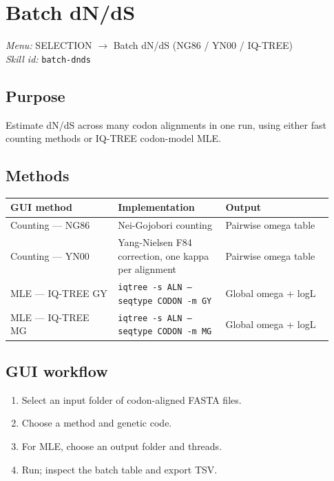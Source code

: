 \documentclass[11pt]{report}
\begin{document}
\section{Batch dN/dS}
\noindent\textit{Menu:} SELECTION $\rightarrow$ Batch dN/dS (NG86 / YN00 / IQ-TREE)\\
\noindent\textit{Skill id:} \texttt{batch-dnds}

\subsection{Purpose}

Estimate dN/dS across many codon alignments in one run, using either fast counting methods or IQ-TREE codon-model MLE.

\subsection{Methods}

{\footnotesize
\begin{longtable}{@{}>{\raggedright\arraybackslash}p{0.31\linewidth}>{\raggedright\arraybackslash}p{0.31\linewidth}>{\raggedright\arraybackslash}p{0.31\linewidth}@{}}
\toprule
GUI method & Implementation & Output \\
\midrule
\endhead
Counting --- NG86 & Nei-Gojobori counting & Pairwise omega table \\
Counting --- YN00 & Yang-Nielsen F84 correction, one kappa per alignment & Pairwise omega table \\
MLE --- IQ-TREE GY & \texttt{iqtree -s ALN --seqtype CODON -m GY} & Global omega + logL \\
MLE --- IQ-TREE MG & \texttt{iqtree -s ALN --seqtype CODON -m MG} & Global omega + logL \\
\bottomrule
\end{longtable}
}

\subsection{GUI workflow}

\begin{enumerate}
  \item Select an input folder of codon-aligned FASTA files.
  \item Choose a method and genetic code.
  \item For MLE, choose an output folder and threads.
  \item Run; inspect the batch table and export TSV.
\end{enumerate}
\end{document}
